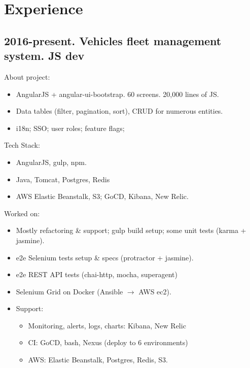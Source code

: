 \documentclass[a4paper, 14pt]{article}
\begin{document}
\section{Experience}
	\subsection{2016-present. Vehicles fleet management system. JS dev}
    About project:
    \begin{itemize}
      \item AngularJS + angular-ui-bootstrap. 60 screens. 20,000 lines of JS. \\
      \item Data tables (filter, pagination, sort), CRUD for numerous entities. \\
      \item i18n; SSO; user roles; feature flags; \\
    \end{itemize}
    Tech Stack:
    \begin{itemize}
      \item AngularJS, gulp, npm. \\
      \item Java, Tomcat, Postgres, Redis \\
      \item AWS Elastic Beanstalk, S3; GoCD, Kibana, New Relic. \\
    \end{itemize}
    Worked on: 
    \begin{itemize}
      \item Mostly refactoring \& support; gulp build setup; some unit tests (karma + jasmine). \\
      \item e2e Selenium tests setup \& specs (protractor + jasmine). \\
      \item e2e REST API tests (chai-http, mocha, superagent) \\
      \item Selenium Grid on Docker (Ansible $\rightarrow$ AWS ec2). \\
      \item Support:
        \begin{itemize}
          \item Monitoring, alerts, logs, charts: Kibana, New Relic \\
          \item CI: GoCD, bash, Nexus (deploy to 6 environments) \\
          \item AWS: Elastic Beanstalk, Postgres, Redis, S3. \\
        \end{itemize}
      \end{itemize}
      
\end{document}
